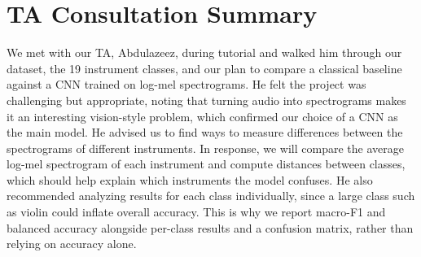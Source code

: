 \documentclass[12pt]{article}
\begin{document}
\section{TA Consultation Summary}
We met with our TA, Abdulazeez, during tutorial and walked him through our dataset, the 19 instrument
classes, and our plan to compare a classical baseline against a CNN trained on log-mel spectrograms.
He felt the project was challenging but appropriate, noting that turning audio into spectrograms makes it an interesting vision-style problem, which confirmed our choice of a CNN as the main model.
He advised us to find ways to measure differences between the spectrograms of different instruments.
In response, we will compare the average log-mel spectrogram of each instrument and compute distances
between classes, which should help explain which instruments the model confuses.
He also recommended analyzing results for each class individually, since a large class such as violin
could inflate overall accuracy. This is why we report macro-F1 and balanced accuracy alongside
per-class results and a confusion matrix, rather than relying on accuracy alone.

\end{document}
